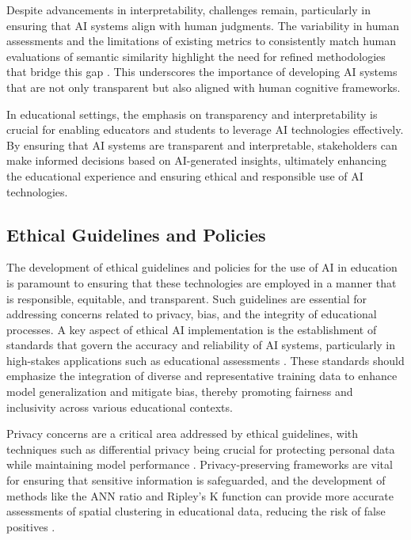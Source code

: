 Despite advancements in interpretability, challenges remain, particularly in ensuring that AI systems align with human judgments. The variability in human assessments and the limitations of existing metrics to consistently match human evaluations of semantic similarity highlight the need for refined methodologies that bridge this gap \cite{yamshchikov2020styletransferparaphraselookingsensible}. This underscores the importance of developing AI systems that are not only transparent but also aligned with human cognitive frameworks.



In educational settings, the emphasis on transparency and interpretability is crucial for enabling educators and students to leverage AI technologies effectively. By ensuring that AI systems are transparent and interpretable, stakeholders can make informed decisions based on AI-generated insights, ultimately enhancing the educational experience and ensuring ethical and responsible use of AI technologies.



\subsection{Ethical Guidelines and Policies} \label{subsec:Ethical Guidelines and Policies}



The development of ethical guidelines and policies for the use of AI in education is paramount to ensuring that these technologies are employed in a manner that is responsible, equitable, and transparent. Such guidelines are essential for addressing concerns related to privacy, bias, and the integrity of educational processes. A key aspect of ethical AI implementation is the establishment of standards that govern the accuracy and reliability of AI systems, particularly in high-stakes applications such as educational assessments \cite{zolfaghari2023surveyautomateddetectionclassification}. These standards should emphasize the integration of diverse and representative training data to enhance model generalization and mitigate bias, thereby promoting fairness and inclusivity across various educational contexts.



Privacy concerns are a critical area addressed by ethical guidelines, with techniques such as differential privacy being crucial for protecting personal data while maintaining model performance \cite{sen2018supervisingfeatureinfluence}. Privacy-preserving frameworks are vital for ensuring that sensitive information is safeguarded, and the development of methods like the ANN ratio and Ripley's K function can provide more accurate assessments of spatial clustering in educational data, reducing the risk of false positives \cite{vidanapathirana2022clusterdetectioncapabilitiesaverage}.



